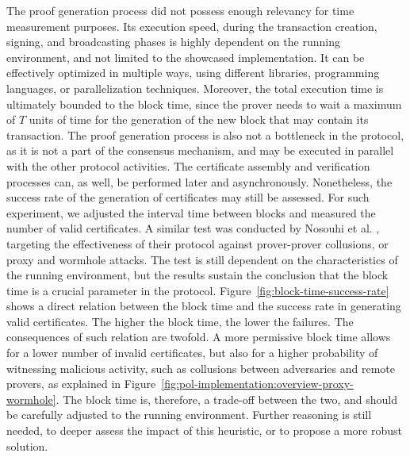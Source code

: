 The proof generation process did not possess enough relevancy for time measurement purposes. Its execution speed, during the transaction creation, signing, and broadcasting phases is highly dependent on the running environment, and not limited to the showcased implementation. It can be effectively optimized in multiple ways, using different libraries, programming languages, or parallelization techniques. Moreover, the total execution time is ultimately bounded to the block time, since the prover needs to wait a maximum of $T$ units of time for the generation of the new block that may contain its transaction. The proof generation process is also not a bottleneck in the protocol, as it is not a part of the consensus mechanism, and may be executed in parallel with the other protocol activities. The certificate assembly and verification processes can, as well, be performed later and asynchronously. Nonetheless, the success rate of the generation of \pol{} certificates may still be assessed. For such experiment, we adjusted the interval time between blocks and measured the number of valid \pol{} certificates. A similar test was conducted by Nosouhi et al. \cite{nosouhi2020blockchain}, targeting the effectiveness of their protocol against prover-prover collusions, or proxy and wormhole attacks. The test is still dependent on the characteristics of the running environment, but the results sustain the conclusion that the block time is a crucial parameter in the protocol. Figure~\ref{fig:block-time-success-rate} shows a direct relation between the block time and the success rate in generating valid certificates. The higher the block time, the lower the failures. The consequences of such relation are twofold. A more permissive block time allows for a lower number of invalid certificates, but also for a higher probability of witnessing malicious activity, such as collusions between adversaries and remote provers, as explained in Figure~\ref{fig:pol-implementation:overview-proxy-wormhole}. The block time is, therefore, a trade-off between the two, and should be carefully adjusted to the running environment. Further reasoning is still needed, to deeper assess the impact of this heuristic, or to propose a more robust solution.

